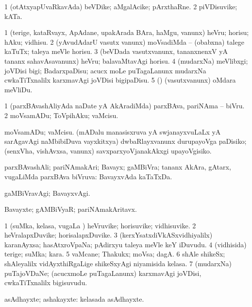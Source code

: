 \bentry
{}
\gl{\nA}
\bmng
\bnum
\num{1} (otAtxyapUvaRkavAda) beVDike; aMgalAcike; pArxthaRne. 
\num{2} piVDisuvike; kATa. 
\enum
\emng
\eentry

\bentry
{}
\gl{\sakirx}
\bmng
\bnum
\num{1} (terige, kataRvayx, ApAdane, upakArada BAra, haMgu, \mo vanunx) heVru; horisu; hAku; vidhisu. 
\num{2} (yAvudAdarU vasutx \mo vanunx) moVsadiMda -- (obabxna) talege kaTuTx; taleya meVle horisu. 
\num{3} (beVDada vasutxvanunx, tananxnenxV yA tananx sahavAsavanunx) heVru; balavaMtavAgi horisu. 
\num{4} (mudarxNa) meVlibxgi; joVDisi bigi; BadarxpaDisu; acucx moLe puTagaLanunx mudarxNa cwkaTiTxnalilx karxmavAgi joVDisi bigipaDisu. 
\num{5} (\pArxparx) (vasutxvanunx) oMdara meVliDu. 
\enum
\emng

\noindent
\gl{\akirx}
\bmng
\bnum
\num{1} (parxBAvashAliyAda naDate yA AkAradiMda) parxBAva, pariNAma -- biVru. 
\num{2} moVsamADu; ToVpihAku; vaMcisu. 
\enum
\emng

\noindent
\gl{\pagu}
\bmng
{}  
\banum
{} moVsamADu; vaMcisu. 
 (mADalu manasisxruva yA swjanayxvuLaLx yA sarAgavAgi naMbibiDuva vayxkitxya) dwbaRlayxvanunx durupayoVga paDisiko; (senxVha, vishAvxsa, \mo vanunx) savxparxyoVjanakAkxgi upayoVgisiko. 
\eanum
\emng
\eentry

\bentry
{}
\gl{\gu}
\bmng
parxBAvashAli; pariNAmakAri; Bavayx; gaMBiVra; tananx AkAra, gAtarx, \mo vugaLiMda parxBAva biVruva:  BavayxvAda kaTaTxDa. 
\emng
\eentry

\bentry
{}
\gl{\kirxvi}
\bmng
gaMBiVravAgi; BavayxvAgi. 
\emng
\eentry

\bentry
{}
\gl{\nA}
\bmng
Bavayxte; gAMBiVyaR; pariNAmakAritavx. 
\emng
\eentry

\bentry
{}
\gl{\nA}
\bmng
\bnum
\num{1} (suMka, kelasa, \mo vugaLa \vi) heVruvike; horisuvike; vidhisuvike. 
\num{2} heVralapxDuvike; horisalapxDuvike. 
\num{3} (kerxYsatxdiVkASxvidhiyalilx) karanAyxsa; hasAtxroVpaNa; pAdirxyu taleya meVle keY iDuvudu. 
\num{4} (vidhisida) terige; suMka; kara. 
\num{5} vaMcane; Thakukx; moVsa; dagA. 
\num{6} shAle shikeSx; shAleyalilx vidAyxthiRgaLige shikeSxyAgi niyamisida kelasa. 
\num{7} (mudarxNa) puTajoVDaNe; (acucxmoLe puTagaLanunx) karxmavAgi joVDisi, cwkaTiTxnalilx bigisuvudu. 
\enum
\emng
\eentry

\bentry
{}
\gl{\nA}
\bmng
asAdhayxte; ashakayxte:  kelasada asAdhayxte. 
\emng
\eentry

